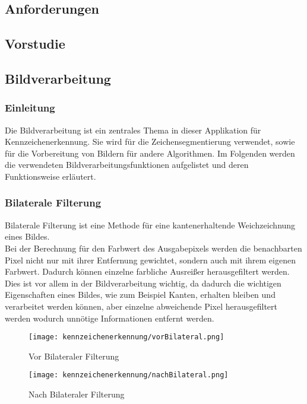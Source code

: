 \def \sectionauthors {Samuel Bleiner}
\subsection{Anforderungen}
\lipsum[1-5]
\subsection{Vorstudie}
\lipsum[1-5]

\subsection{Bildverarbeitung}

\subsubsection{Einleitung}
Die Bildverarbeitung ist ein zentrales Thema in dieser Applikation für Kennzeichenerkennung. 
Sie wird für die Zeichensegmentierung verwendet, sowie für die Vorbereitung von Bildern für 
andere Algorithmen. Im Folgenden werden die verwendeten Bildverarbeitungsfunktionen aufgelistet 
und deren Funktionsweise erläutert.

\subsubsection{Bilaterale Filterung}
Bilaterale Filterung ist eine Methode für eine kantenerhaltende Weichzeichnung eines Bildes.\\

Bei der Berechnung für den Farbwert des Ausgabepixels werden die benachbarten Pixel nicht nur 
mit ihrer Entfernung gewichtet, sondern auch mit ihrem eigenen Farbwert. Dadurch können einzelne 
farbliche Ausreißer herausgefiltert werden. Dies ist vor allem in der Bildverarbeitung wichtig, 
da dadurch die wichtigen Eigenschaften eines Bildes, wie zum Beispiel Kanten, erhalten bleiben 
und verarbeitet werden können, aber einzelne abweichende Pixel herausgefiltert werden wodurch 
unnötige Informationen entfernt werden.\\ 

\begin{figure}[htbp]
    \centering
    \begin{minipage}[t]{0.45\linewidth}
        \centering
        \texttt{[image: kennzeichenerkennung/vorBilateral.png]}
        \caption{Vor Bilateraler Filterung}
        \label{vorBi}
    \end{minipage}
    \hfill
    \begin{minipage}[t]{0.45\linewidth}
        \centering
        \texttt{[image: kennzeichenerkennung/nachBilateral.png]}
        \caption{Nach Bilateraler Filterung}
        \label{nachBi}
    \end{minipage}
\end{figure}

